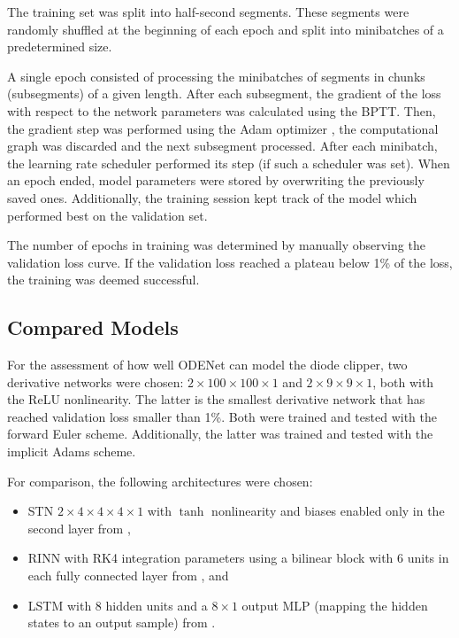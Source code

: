 The training set was split into half-second segments. These segments were randomly shuffled at the beginning of each epoch and split into minibatches of a predetermined size.

A single epoch consisted of processing the minibatches of segments in chunks (subsegments) of a given length. After each subsegment, the gradient of the loss with respect to the network parameters was calculated using the \ac{BPTT}. Then, the gradient step was performed using the Adam optimizer \cite{Kingma2017}, the computational graph was discarded and the next subsegment processed. After each minibatch, the learning rate scheduler performed its step (if such a scheduler was set). When an epoch ended, model parameters were stored by overwriting the previously saved ones. Additionally, the training session kept track of the model which performed best on the validation set.

The number of epochs in training was determined by manually observing the validation loss curve. If the validation loss reached a plateau below 1\% of the loss, the training was deemed successful.

\subsection{Compared Models}
\label{sec:diode_clipper_models}

For the assessment of how well ODENet can model the diode clipper, two derivative networks were chosen: $2 \times 100 \times 100 \times 1$ and $2 \times 9 \times 9 \times 1$, both with the \ac{ReLU} nonlinearity. The latter is the smallest derivative network that has reached validation loss smaller than 1\%. Both were trained and tested with the forward Euler scheme. Additionally, the latter was trained and tested with the implicit Adams scheme.

For comparison, the following architectures were chosen:
\begin{itemize}
    \item \ac{STN} $2 \times 4 \times 4 \times 4 \times 1$ with $\tanh$ nonlinearity and biases enabled only in the second layer from \cite{Parker2019}, 
    \item \ac{RINN} with \ac{RK}4 integration parameters using a bilinear block with 6 units in each fully connected layer from \cite{Ouala2019}, and 
    \item \ac{LSTM} with 8 hidden units and a $8 \times 1$ output \ac{MLP} (mapping the hidden states to an output sample) from \cite{Wright2019}.
\end{itemize}

